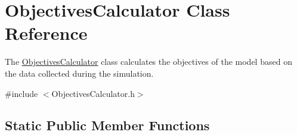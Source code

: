 \hypertarget{classObjectivesCalculator}{}\section{Objectives\+Calculator Class Reference}
\label{classObjectivesCalculator}


The \mbox{\hyperlink{classObjectivesCalculator}{Objectives\+Calculator}} class calculates the objectives of the model based on the data collected during the simulation.  




{\ttfamily \#include $<$Objectives\+Calculator.\+h$>$}

\subsection*{Static Public Member Functions}
